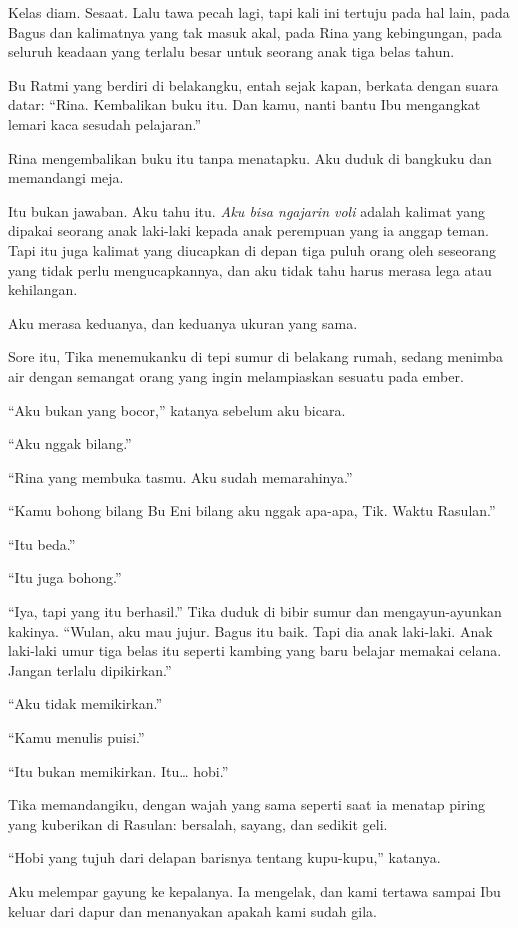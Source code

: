 \documentclass[11pt,twoside,openany]{book}
\makeatletter
\newcommand{\scenebreak}{\par\vspace{0.9em}{\centering\textsc{*\hspace{0.7em}*\hspace{0.7em}*}\par}\vspace{0.9em}\@afterindentfalse\@afterheading}
\makeatother
\begin{document}
Kelas diam. Sesaat. Lalu tawa pecah lagi, tapi kali ini tertuju pada hal lain, pada Bagus dan kalimatnya yang tak masuk akal, pada Rina yang kebingungan, pada seluruh keadaan yang terlalu besar untuk seorang anak tiga belas tahun.

Bu Ratmi yang berdiri di belakangku, entah sejak kapan, berkata dengan suara datar: ``Rina. Kembalikan buku itu. Dan kamu, nanti bantu Ibu mengangkat lemari kaca sesudah pelajaran.''

Rina mengembalikan buku itu tanpa menatapku. Aku duduk di bangkuku dan memandangi meja.

Itu bukan jawaban. Aku tahu itu. \emph{Aku bisa ngajarin voli} adalah kalimat yang dipakai seorang anak laki-laki kepada anak perempuan yang ia anggap teman. Tapi itu juga kalimat yang diucapkan di depan tiga puluh orang oleh seseorang yang tidak perlu mengucapkannya, dan aku tidak tahu harus merasa lega atau kehilangan.

Aku merasa keduanya, dan keduanya ukuran yang sama.

\scenebreak
Sore itu, Tika menemukanku di tepi sumur di belakang rumah, sedang menimba air dengan semangat orang yang ingin melampiaskan sesuatu pada ember.

``Aku bukan yang bocor,'' katanya sebelum aku bicara.

``Aku nggak bilang.''

``Rina yang membuka tasmu. Aku sudah memarahinya.''

``Kamu bohong bilang Bu Eni bilang aku nggak apa-apa, Tik. Waktu Rasulan.''

``Itu beda.''

``Itu juga bohong.''

``Iya, tapi yang itu berhasil.'' Tika duduk di bibir sumur dan mengayun-ayunkan kakinya. ``Wulan, aku mau jujur. Bagus itu baik. Tapi dia anak laki-laki. Anak laki-laki umur tiga belas itu seperti kambing yang baru belajar memakai celana. Jangan terlalu dipikirkan.''

``Aku tidak memikirkan.''

``Kamu menulis puisi.''

``Itu bukan memikirkan. Itu\ldots{} hobi.''

Tika memandangiku, dengan wajah yang sama seperti saat ia menatap piring yang kuberikan di Rasulan: bersalah, sayang, dan sedikit geli.

``Hobi yang tujuh dari delapan barisnya tentang kupu-kupu,'' katanya.

Aku melempar gayung ke kepalanya. Ia mengelak, dan kami tertawa sampai Ibu keluar dari dapur dan menanyakan apakah kami sudah gila.
\end{document}
